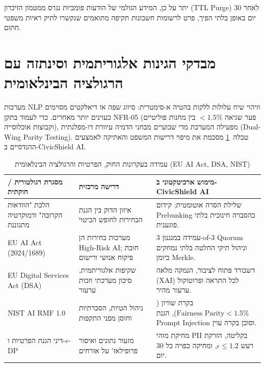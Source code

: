 יתר על כן, המידע הגולמי של הודעות פומביות נגרס ממטמון הזיכרון (TTL Purge) לאחר 30 יום באופן בלתי הפיך, פרט לרשומות חשבונות תקיפה מתואמים שנקשרו לתיק ראיות משפטי חתום.

\section{מבדקי הגינות אלגוריתמית וסינתזה עם הרגולציה הבינלאומית}
מערכות NLP וזיהוי שיח עלולות ללקות בהטיה א-סימטרית: סיווג שפה או דיאלקטים מסוימים כעוינים יותר מאחרים. כדי לעמוד בתקן NFR-05 (פער שגיאה $< 1.5\%$ בין מחנות פוליטיים וקבוצות אוכלוסייה), מפעילה המערכת מדי שבועיים מבחני הדמיה עיוורת דו-מפלגתית (Dual-Wing Parity Testing). טבלה~\ref{tab:law_compliance} מסכמת את מיפוי דרישות המשפט והאתיקה לאמצעים ההנדסיים ב-CivicShield AI.

\begin{table}[htbp]
    \centering
    \caption{עמידה בעקרונות החוק, הפרטיות והרגולציה הבינלאומית (EU AI Act, DSA, NIST)}
    \label{tab:law_compliance}
    \renewcommand{\arraystretch}{1.25}
    \begin{tabular}{|p{3.2cm}|p{3.8cm}|p{7.0cm}|}
        \hline
        \textbf{מסגרת רגולטורית / חוקתית} & \textbf{דרישה מרכזית} & \textbf{מימוש ארכיטקטוני ב-CivicShield AI} \\
        \hline
        הלכת "הוודאות הקרובה" ודמוקרטיה מתגוננת~\cite{barak1988defensive} & איזון הדוק בין הגנת הבחירות לחופש הביטוי & שלילת הסרה אוטומטית; קידום Prebunking כהסברה חינוכית בלתי פוגענית. \\
        \hline
        EU AI Act (2024/1689)~\cite{eu2024aiact} & מערכות בחירות הן High-Risk AI; חובת פיקוח אנושי ורישום & עמידה במנגנון 3-of-3 Quorum וניהול תיקי החלטה בלתי נמחקים ביומן Merkle. \\
        \hline
        EU Digital Services Act (DSA)~\cite{eu2022dsa} & שקיפות אלגוריתמית, סיכון מערכתי וזכות ערעור & דשבורד פתוח לציבור, הנמקה מלאה (XAI) לכל התראה ופרוטוקול ערעור מהיר. \\
        \hline
        NIST AI RMF 1.0~\cite{nist2023rmf} & ניהול הטיות, הסברתיות וחוסן מפני התקפות & בקרת שוויון ($\text{Fairness Parity} < 1.5\%$), הגנת Prompt Injection וסוכן בקרה עוין. \\
        \hline
        דיני הגנת הפרטיות ו-$\epsilon$-DP~\cite{dwork2014dp} & מזעור נתונים ואיסור פרופילאז' על אזרחים & מחיקת מזהי PII בקליטה, הזרקת רעש $\epsilon \le 1.2$, ומחיקה כפויה כל 30 יום. \\
        \hline
    \end{tabular}
\end{table}
